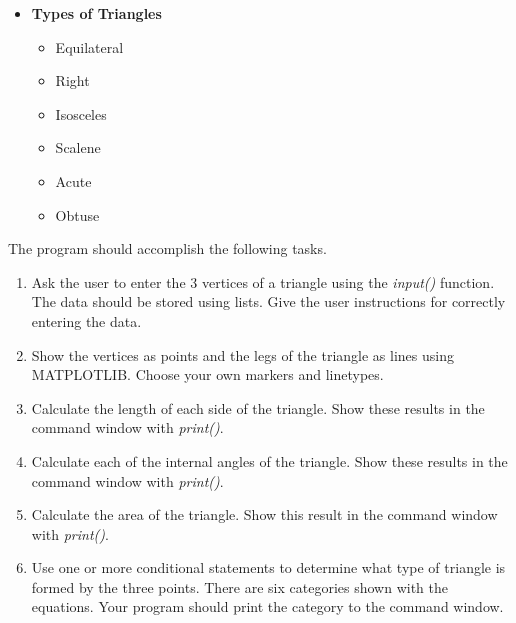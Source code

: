 \documentclass[12pt]{article}
\begin{document}
\begin{description}[labelindent=1cm]
\begin{itemize}
             \vspace{2mm}\\
             \vspace{2mm}\\
             \vspace{2mm}\\   

            \item \textbf{Types of Triangles}
                \begin{itemize}
                \item Equilateral
                \item Right
                \item Isosceles
                \item Scalene
                \item Acute 
                \item Obtuse
                \end{itemize} 
        \end{itemize}
        
        \vspace{20mm}

        \newpage
        \item [\textbf{\underline{Program Minimum Requirements:}}] The program should accomplish the following tasks.
        \begin{enumerate}
            \item Ask the user to enter the 3 vertices of a triangle using the {\it input()} function. The data should be stored using lists. Give the user instructions for correctly entering the data. \\
            \item Show the vertices as points and the legs of the triangle as lines using MATPLOTLIB. Choose your own markers and linetypes.  \\
            \item Calculate the length of each side of the triangle. Show these results in the command window with {\it print()}. \\
            \item Calculate each of the internal angles of the triangle. Show these results in the command window  with {\it print()}. \\  
            \item Calculate the area of the triangle. Show this result in the command window  with {\it print()}. \\  
            \item Use one or more conditional statements to determine what type of triangle is formed by the three points. There are six categories shown with the equations. Your program should print the category to the command window. \\
        \end{enumerate}


\end{description}
\end{document}
